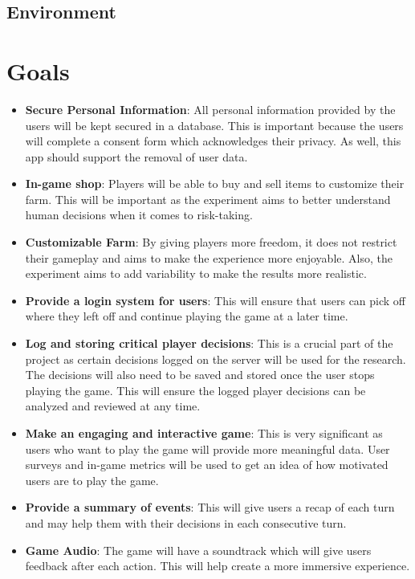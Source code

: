 \documentclass{article}
\begin{document}
\subsection{Environment}


\section{Goals}
\begin{itemize}
    \item \textbf{Secure Personal Information}: All personal information provided by the users will be kept secured in a database. This is important because the users will complete a consent form which acknowledges their privacy. As well, this app should support the removal of user data. 
    \item \textbf{In-game shop}: Players will be able to buy and sell items to customize their farm. This will be important as the experiment aims to better understand human decisions when it comes to risk-taking.
    \item \textbf{Customizable Farm}: By giving players more freedom, it does not restrict their gameplay and aims to make the experience more enjoyable. Also, the experiment aims to add variability to make the results more realistic.
    \item \textbf{Provide a login system for users}: This will ensure that users can pick off where they left off and continue playing the game at a later time. 
    \item \textbf{Log and storing critical player decisions}: This is a crucial part of the project as certain decisions logged on the server will be used for the research. The decisions will also need to be saved and stored once the user stops playing the game. This will ensure the logged player decisions can be analyzed and reviewed at any time.
    \item \textbf{Make an engaging and interactive game}: This is very significant as users who want to play the game will provide more meaningful data. User surveys and in-game metrics will be used to get an idea of how motivated users are to play the game.
    \item \textbf{Provide a summary of events}: This will give users a recap of each turn and may help them with their decisions in each consecutive turn. 
    \item \textbf{Game Audio}: The game will have a soundtrack which will give users feedback after each action. This will help create a more immersive experience.
\end{itemize}
\end{document}
